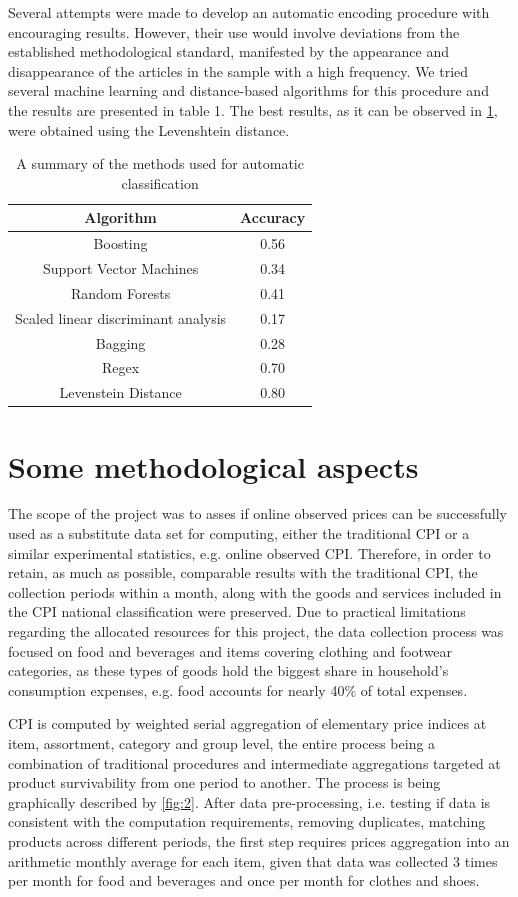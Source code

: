 \documentclass[]{article}
\begin{document}
Several attempts were made to develop an automatic encoding procedure with encouraging results. However, their use 
would involve deviations from the established methodological standard, manifested by the appearance and disappearance 
of the articles in the sample with a high frequency. We tried several machine learning and distance-based algorithms 
for this procedure and the results are presented in table 1. The best results, as it can be observed in \ref{table:1}, 
were obtained using the Levenshtein distance.


\begin{table}[h!]
\centering
\begin{tabular}{ c c }
	\hline
	Algorithm & Accuracy \\
	\hline  
	Boosting & 0.56 \\  
	Support Vector Machines & 0.34 \\
	Random Forests &  0.41 \\
	Scaled linear discriminant analysis & 0.17 \\
	Bagging & 0.28 \\
	Regex & 0.70 \\
	Levenstein Distance & 0.80 \\
	\hline
\end{tabular}
\caption{A summary of the methods used for automatic classification}
\label{table:1}
\end{table}

\section{Some methodological aspects}\label{methodology}

The scope of the project was to asses if online observed prices can be successfully
used as a substitute data set for computing, either the traditional CPI or a similar 
experimental statistics, e.g. online observed CPI. Therefore, in order to retain, 
as much as possible, comparable results with the traditional CPI, the collection periods 
within a month, along with the goods and services included in the CPI national classification 
were preserved. Due to practical limitations regarding the allocated resources for 
this project, the data collection process was focused on food and beverages and items 
covering clothing and footwear categories, as these types of goods hold the biggest share in 
household's consumption expenses, e.g. food accounts for nearly 40\% of total expenses\cite{hhs}. 

CPI is computed by weighted serial aggregation of elementary price indices at item, assortment, 
category and group level, the entire process being a combination of traditional procedures\cite{cpi} 
and intermediate aggregations targeted at product survivability from one period to another. 
The process is being graphically described by \ref{fig:2}. After data pre-processing, i.e. testing 
if data is consistent with the computation requirements, removing duplicates, matching 
products across different periods, the first step requires prices aggregation into an arithmetic 
monthly average for each item, given that data was collected 3 times per month for food and 
beverages and once per month for clothes and shoes. 
\end{document}
